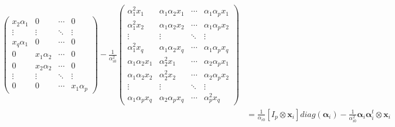 \documentclass[10pt]{article}
\theoremstyle{definition}
\begin{document}
\begin{align*}
\begin{pmatrix}
x_2 \alpha_1 & 0 & \cdots & 0 \\
\vdots & \vdots & \ddots & \vdots \\
x_q\alpha_1 & 0 & \cdots & 0 \\
0 & x_1 \alpha_2 & \cdots & 0 \\
0 & x_2 \alpha_2 & \cdots & 0 \\
\vdots & \vdots & \ddots & \vdots \\
0 & 0 & \cdots & x_1 \alpha_p
\end{pmatrix} - \frac{1}{\alpha_{i0}^2}\begin{pmatrix} \alpha_1^2 x_1 & \alpha_1\alpha_2 x_1 & \cdots & \alpha_1\alpha_p x_1 \\
\alpha_1^2 x_2 &\alpha_1\alpha_2 x_2 & \cdots &  \alpha_1\alpha_p x_2\\
\vdots & \vdots &\ddots & \vdots \\
\alpha_1^2 x_q & \alpha_1\alpha_2 x_q & \cdots & \alpha_1 \alpha_p x_q\\
\alpha_1\alpha_2x_1 & \alpha_2^2  x_1 & \cdots & \alpha_2 \alpha_p x_1 \\
\alpha_1\alpha_2x_2 & \alpha_2^2  x_2 & \cdots & \alpha_2 \alpha_p x_2\\
\vdots & \vdots & \ddots &\vdots \\
\alpha_1\alpha_p x_q & \alpha_2\alpha_p x_q & \cdots & \alpha_p^2 x_q\end{pmatrix}\\
&= \frac{1}{\alpha_{i0}}[I_p \otimes \mathbf{x}_i] diag(\boldsymbol\alpha_i) - \frac{1}{\alpha_{i0}^2} \boldsymbol\alpha_i \boldsymbol\alpha_i^t \otimes \mathbf{x}_i

\end{align*}
\end{document}
